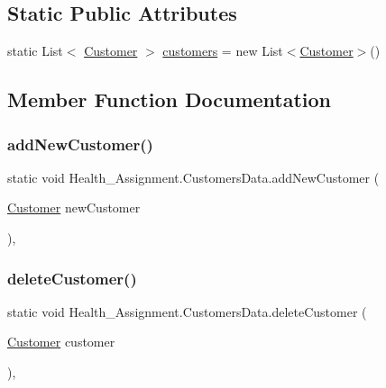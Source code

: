 \subsection*{Static Public Attributes}
\begin{DoxyCompactItemize}
\item 
static List$<$ \hyperlink{class_health___assignment_1_1_customer}{Customer} $>$ \hyperlink{class_health___assignment_1_1_customers_data_aa28d9351caec2c93d5db78a3d936b7c5}{customers} = new List$<$\hyperlink{class_health___assignment_1_1_customer}{Customer}$>$()
\end{DoxyCompactItemize}


\subsection{Member Function Documentation}
\mbox{\label{class_health___assignment_1_1_customers_data_a62df79057aead98766588126b4c36602}} 
\subsubsection{\texorpdfstring{add\+New\+Customer()}{addNewCustomer()}}
{\footnotesize\ttfamily static void Health\+\_\+\+Assignment.\+Customers\+Data.\+add\+New\+Customer (\begin{DoxyParamCaption}\item[{\hyperlink{class_health___assignment_1_1_customer}{Customer}}]{new\+Customer }\end{DoxyParamCaption})\hspace{0.3cm}{\ttfamily [inline]}, {\ttfamily [static]}}

\mbox{\label{class_health___assignment_1_1_customers_data_afff7bee8ea355d57a6e694e5d10b9f90}} 
\subsubsection{\texorpdfstring{delete\+Customer()}{deleteCustomer()}}
{\footnotesize\ttfamily static void Health\+\_\+\+Assignment.\+Customers\+Data.\+delete\+Customer (\begin{DoxyParamCaption}\item[{\hyperlink{class_health___assignment_1_1_customer}{Customer}}]{customer }\end{DoxyParamCaption})\hspace{0.3cm}{\ttfamily [inline]}, {\ttfamily [static]}}

